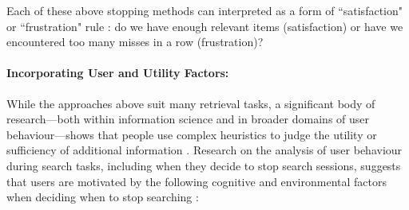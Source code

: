\documentclass[10pt,oneside]{book}
\begin{document}
Each of these above stopping methods can interpreted as a form of ``satisfaction" or ``frustration" rule \cite{ilani_analysis_2024, cooper_selecting_1973}: do we have enough relevant items (satisfaction) or have we encountered too many misses in a row (frustration)?

\paragraph{Incorporating User and Utility Factors: }

While the approaches above suit many retrieval tasks, a significant body of research—both within information science and in broader domains of user behaviour—shows that people use complex heuristics to judge the utility or sufficiency of additional information \cite{nickles_judgment-based_1995, browne_stopping_2005, ilani_analysis_2024}. Research on the analysis of user behaviour during search tasks, including when they decide to stop search sessions, suggests that users are motivated by the following cognitive and environmental factors when deciding when to stop searching \cite{ilani_analysis_2024}:
\end{document}
